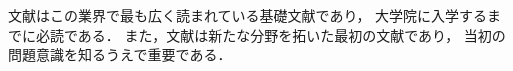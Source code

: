 \documentclass[lualatex,ja=standard,magstyle=real,12pt]{bxjsarticle}
\begin{document}
文献\autocite{hoge2000,foobar1990}はこの業界で最も広く読まれている基礎文献であり，
大学院に入学するまでに必読である．
また，文献\autocite{hoge2001}は新たな分野を拓いた最初の文献であり，
当初の問題意識を知るうえで重要である．
\printbibliography
\end{document}
